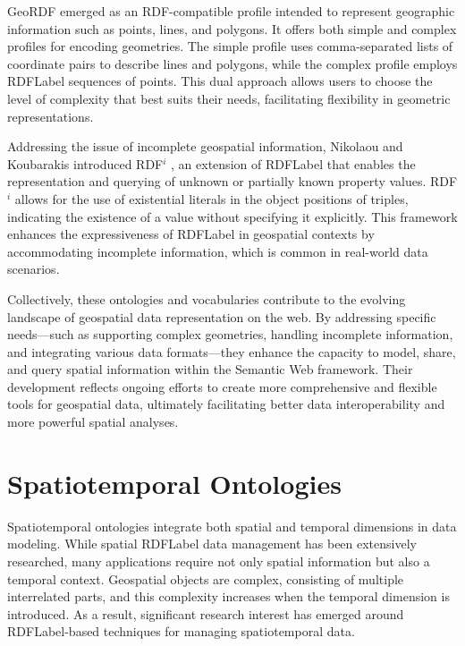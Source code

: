 GeoRDF emerged as an RDF-compatible profile intended to represent geographic information such as points, lines, and polygons. It offers both simple and complex profiles for encoding geometries. The simple profile uses comma-separated lists of coordinate pairs to describe lines and polygons, while the complex profile employs \acrshort{RDFLabel} sequences of points. This dual approach allows users to choose the level of complexity that best suits their needs, facilitating flexibility in geometric representations.

Addressing the issue of incomplete geospatial information, Nikolaou and Koubarakis introduced RDF$^i$ \cite{nikolaouQueryingIncompleteInformation2016a}, an extension of \acrshort{RDFLabel} that enables the representation and querying of unknown or partially known property values. RDF$^i$ allows for the use of existential literals in the object positions of triples, indicating the existence of a value without specifying it explicitly. This framework enhances the expressiveness of \acrshort{RDFLabel} in geospatial contexts by accommodating incomplete information, which is common in real-world data scenarios.

Collectively, these ontologies and vocabularies contribute to the evolving landscape of geospatial data representation on the web. By addressing specific needs—such as supporting complex geometries, handling incomplete information, and integrating various data formats—they enhance the capacity to model, share, and query spatial information within the Semantic Web framework. Their development reflects ongoing efforts to create more comprehensive and flexible tools for geospatial data, ultimately facilitating better data interoperability and more powerful spatial analyses.

\section{Spatiotemporal Ontologies}\label{III-sec:spatiotemporal}

Spatiotemporal ontologies integrate both spatial and temporal dimensions in data modeling. While spatial \acrshort{RDFLabel} data management has been extensively researched, many applications require not only spatial information but also a temporal context. Geospatial objects are complex, consisting of multiple interrelated parts, and this complexity increases when the temporal dimension is introduced. As a result, significant research interest has emerged around \acrshort{RDFLabel}-based techniques for managing spatiotemporal data.

